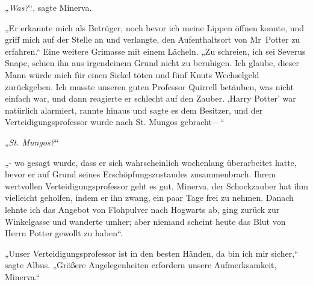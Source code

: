 „\emph{Was?}“, sagte Minerva.

„Er erkannte mich als Betrüger, noch bevor ich meine Lippen öffnen konnte, und griff mich auf der Stelle an und verlangte, den Aufenthaltsort von Mr~Potter zu erfahren.“ Eine weitere Grimasse mit einem Lächeln. „Zu schreien, ich sei Severus Snape, schien ihn aus irgendeinem Grund nicht zu beruhigen. Ich glaube, dieser Mann würde mich für einen Sickel töten und fünf Knuts Wechselgeld zurückgeben. Ich musste unseren guten Professor Quirrell betäuben, was nicht einfach war, und dann reagierte er schlecht auf den Zauber. ‚Harry Potter' war natürlich alarmiert, rannte hinaus und sagte es dem Besitzer, und der Verteidigungsprofessor wurde nach St. Mungos gebracht—“

„\emph{St. Mungos?}“

„- wo gesagt wurde, dass er sich wahrscheinlich wochenlang überarbeitet hatte, bevor er auf Grund seines Erschöpfungszustandes zusammenbrach. Ihrem wertvollen Verteidigungsprofessor geht es gut, Minerva, der Schockzauber hat ihm vielleicht geholfen, indem er ihn zwang, ein paar Tage frei zu nehmen. Danach lehnte ich das Angebot von Flohpulver nach Hogwarts ab, ging zurück zur Winkelgasse und wanderte umher; aber niemand scheint heute das Blut von Herrn Potter gewollt zu haben“.

„Unser Verteidigungsprofessor ist in den besten Händen, da bin ich mir sicher,“ sagte Albus. „Größere Angelegenheiten erfordern unsere Aufmerksamkeit, Minerva.“

